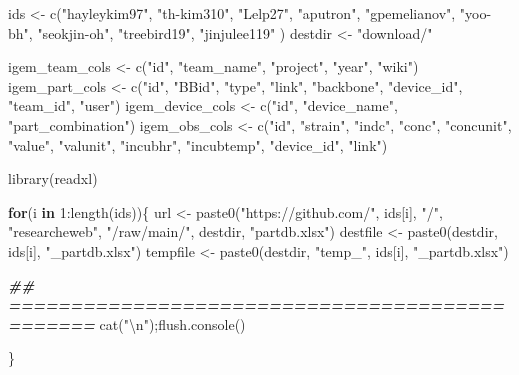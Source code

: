 \documentclass[
]{article}
\newenvironment{Shaded}{\begin{snugshade}}{\end{snugshade}}
\newcommand{\ControlFlowTok}[1]{\textcolor[rgb]{0.13,0.29,0.53}{\textbf{#1}}}
\newcommand{\DecValTok}[1]{\textcolor[rgb]{0.00,0.00,0.81}{#1}}
\newcommand{\DocumentationTok}[1]{\textcolor[rgb]{0.56,0.35,0.01}{\textbf{\textit{#1}}}}
\newcommand{\FunctionTok}[1]{\textcolor[rgb]{0.00,0.00,0.00}{#1}}
\newcommand{\NormalTok}[1]{#1}
\newcommand{\OtherTok}[1]{\textcolor[rgb]{0.56,0.35,0.01}{#1}}
\newcommand{\SpecialCharTok}[1]{\textcolor[rgb]{0.00,0.00,0.00}{#1}}
\newcommand{\StringTok}[1]{\textcolor[rgb]{0.31,0.60,0.02}{#1}}
\begin{document}
\begin{Shaded}
\begin{Highlighting}[]
\NormalTok{ids }\OtherTok{\textless{}{-}} \FunctionTok{c}\NormalTok{(}\StringTok{"hayleykim97"}\NormalTok{, }
         \StringTok{"th{-}kim310"}\NormalTok{,}
         \StringTok{"Lelp27"}\NormalTok{,}
         \StringTok{"aputron"}\NormalTok{,}
         \StringTok{"gpemelianov"}\NormalTok{,}
         \StringTok{"yoo{-}bh"}\NormalTok{,}
         \StringTok{"seokjin{-}oh"}\NormalTok{,}
         \StringTok{"treebird19"}\NormalTok{,}
         \StringTok{"jinjulee119"}
\NormalTok{         )}
\NormalTok{destdir }\OtherTok{\textless{}{-}} \StringTok{"download/"}

\NormalTok{igem\_team\_cols }\OtherTok{\textless{}{-}} \FunctionTok{c}\NormalTok{(}\StringTok{"id"}\NormalTok{, }\StringTok{"team\_name"}\NormalTok{, }\StringTok{"project"}\NormalTok{, }\StringTok{"year"}\NormalTok{, }\StringTok{"wiki"}\NormalTok{)}
\NormalTok{igem\_part\_cols }\OtherTok{\textless{}{-}} \FunctionTok{c}\NormalTok{(}\StringTok{"id"}\NormalTok{, }\StringTok{"BBid"}\NormalTok{, }\StringTok{"type"}\NormalTok{, }\StringTok{"link"}\NormalTok{, }\StringTok{"backbone"}\NormalTok{, }\StringTok{"device\_id"}\NormalTok{, }\StringTok{"team\_id"}\NormalTok{, }\StringTok{"user"}\NormalTok{)}
\NormalTok{igem\_device\_cols }\OtherTok{\textless{}{-}} \FunctionTok{c}\NormalTok{(}\StringTok{"id"}\NormalTok{, }\StringTok{"device\_name"}\NormalTok{, }\StringTok{"part\_combination"}\NormalTok{)}
\NormalTok{igem\_obs\_cols }\OtherTok{\textless{}{-}} \FunctionTok{c}\NormalTok{(}\StringTok{"id"}\NormalTok{, }\StringTok{"strain"}\NormalTok{, }\StringTok{"indc"}\NormalTok{, }\StringTok{"conc"}\NormalTok{, }\StringTok{"concunit"}\NormalTok{, }\StringTok{"value"}\NormalTok{, }\StringTok{"valunit"}\NormalTok{, }\StringTok{"incubhr"}\NormalTok{, }\StringTok{"incubtemp"}\NormalTok{, }\StringTok{"device\_id"}\NormalTok{, }\StringTok{"link"}\NormalTok{)}

\FunctionTok{library}\NormalTok{(readxl)}

\ControlFlowTok{for}\NormalTok{(i }\ControlFlowTok{in} \DecValTok{1}\SpecialCharTok{:}\FunctionTok{length}\NormalTok{(ids))\{}
\NormalTok{  url }\OtherTok{\textless{}{-}}  \FunctionTok{paste0}\NormalTok{(}\StringTok{"https://github.com/"}\NormalTok{, ids[i], }\StringTok{"/"}\NormalTok{, }\StringTok{"researcheweb"}\NormalTok{, }\StringTok{"/raw/main/"}\NormalTok{, destdir, }\StringTok{"partdb.xlsx"}\NormalTok{)}
\NormalTok{  destfile }\OtherTok{\textless{}{-}} \FunctionTok{paste0}\NormalTok{(destdir, ids[i], }\StringTok{"\_partdb.xlsx"}\NormalTok{)}
\NormalTok{  tempfile }\OtherTok{\textless{}{-}} \FunctionTok{paste0}\NormalTok{(destdir, }\StringTok{"temp\_"}\NormalTok{, ids[i], }\StringTok{"\_partdb.xlsx"}\NormalTok{)}

  \DocumentationTok{\#\# ===============================================}
  \FunctionTok{cat}\NormalTok{(}\StringTok{"}\SpecialCharTok{\textbackslash{}n}\StringTok{"}\NormalTok{);}\FunctionTok{flush.console}\NormalTok{()}
  
  
\NormalTok{\}}
\end{Highlighting}
\end{Shaded}
\end{document}
